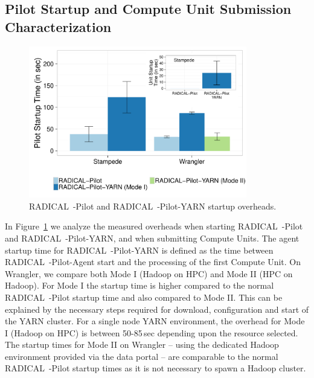 \subsection{Pilot Startup and Compute Unit Submission Characterization}
\label{ssec:startup_pilot_unit}

\begin{figure}[t]
    \centering
    \includegraphics[width=0.85\textwidth]{figures/data_analytics_hpc/hpc_hadoop/pilot_unit_startup.pdf}
    \caption{RADICAL~-Pilot and RADICAL~-Pilot-YARN startup overheads.
        \label{fig:startup_yarn}}
\end{figure}

In Figure~\ref{fig:startup_yarn} we analyze the measured overheads when starting RADICAL~-Pilot and RADICAL~-Pilot-YARN, and when submitting Compute Units.
The agent startup time for RADICAL~-Pilot-YARN is defined as the time between RADICAL~-Pilot-Agent start and the processing of the first Compute Unit.
On Wrangler, we compare both Mode I (Hadoop on HPC) and Mode II (HPC on Hadoop).
For Mode I the startup time is higher compared to the normal RADICAL~-Pilot startup time and also compared to Mode II.
This can be explained by the necessary steps required for download, configuration and start of the YARN cluster.
For a single node YARN environment, the overhead for Mode I (Hadoop on HPC) is between 50-85\,sec depending upon the resource selected.
The startup times for Mode II on Wrangler -- using the dedicated Hadoop environment provided via the data portal -- are comparable to the normal RADICAL~-Pilot startup times as it is not necessary to spawn a Hadoop cluster.

